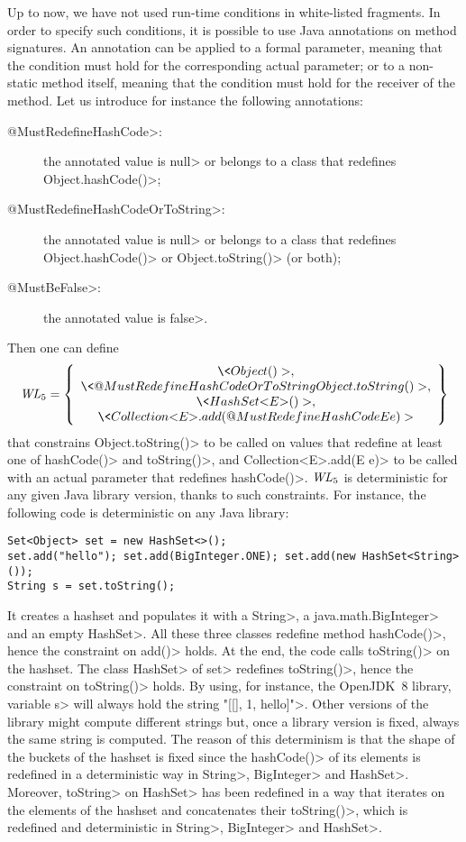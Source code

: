 Up to now, we have not used run-time conditions in white-listed fragments.
In order to specify such conditions, it is possible to use Java annotations on
method signatures. An annotation can be applied to a formal parameter, meaning that
the condition must hold for the corresponding actual parameter; or to a non-static method
itself, meaning that the condition must hold for the receiver of the method.
Let us introduce for instance the following annotations:
%
\begin{description}
\item[\<@MustRedefineHashCode>:] the annotated value is \<null> or belongs to a class that redefines
  \<Object.hashCode()>;
\item[\<@MustRedefineHashCodeOrToString>:] the annotated value is \<null> or belongs to a class that redefines
  \<Object.hashCode()> or \<Object.toString()> (or both);
\item[\<@MustBeFalse>:] the annotated value is \<false>.
\end{description}
%
Then one can define
%
\[
\wl_5=\left\{\begin{array}{c}
\<Object()>,\\
\<@MustRedefineHashCodeOrToString Object.toString()>,\\
\<HashSet\text{<}E\text{>}()>,\\
\<Collection\text{<}E\text{>}.add(@MustRedefineHashCode E e)>
\end{array}\right\}
\]
%
that constrains \<Object.toString()> to be called on values that redefine
at least one of \<hashCode()> and \<toString()>, and
\<Collection$\text{<}$E$\text{>}$.add(E e)> to be called
with an actual parameter that redefines \<hashCode()>. $\mathit{WL}_5$ is deterministic
for any given Java library version, thanks
to such constraints. For instance, the following code is deterministic
on any Java library:

{\scriptsize\begin{verbatim}
Set<Object> set = new HashSet<>();
set.add("hello"); set.add(BigInteger.ONE); set.add(new HashSet<String>());
String s = set.toString();
\end{verbatim}}

\noindent
It creates a hashset and populates it with a
\<String>, a \<java.math.BigInteger> and an empty \<HashSet>. All these three
classes redefine method \<hashCode()>, hence the constraint on \<add()> holds.
At the end, the code calls \<toString()> on the hashset.
The class \<HashSet> of \<set> redefines \<toString()>, hence the constraint
on \<toString()> holds. By using, for instance, the
OpenJDK~8 library, variable \<s> will always hold the string
\<"[[], 1, hello]">. Other versions of the library might compute different strings but,
once a library version is fixed, always the same string is computed.
The reason of this determinism is that the shape of the buckets of the hashset is fixed
since the \<hashCode()> of its elements is redefined in a deterministic way in
\<String>, \<BigInteger> and \<HashSet>. Moreover, \<toString> on \<HashSet> has been
redefined in a way that iterates on the elements of the hashset and concatenates
their \<toString()>, which is redefined and deterministic in
\<String>, \<BigInteger> and \<HashSet>.

